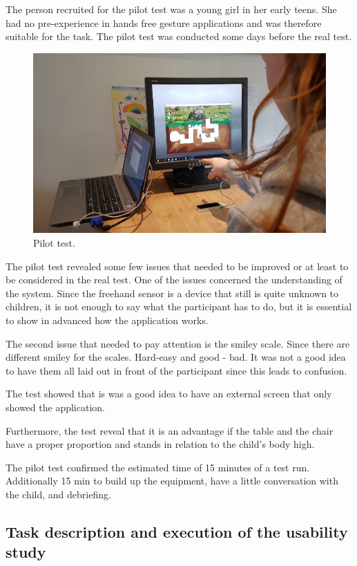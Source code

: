 The person recruited for the pilot test was a young girl in her early teens. She had no pre-experience in hands free gesture applications and was therefore suitable for the task.
The pilot test was conducted some days before the real test.

\begin{figure}[h]  %
  \centering
  \includegraphics[width=.5\textwidth]{figures/pilottest.jpg}
  \caption[Pilot test.]{Pilot test.}
  \label{fig:setup}
\end{figure}

The pilot test revealed some few issues that needed to be improved or at least to be considered in the real test.  One of the issues concerned the understanding of the system. Since the freehand sensor is a device that still is quite unknown to children,  it is  not enough to say what the participant has to do, but it is  essential to show in advanced how the application works.

The second issue that needed to pay attention is the smiley scale. Since there are different smiley for the scales. Hard-easy and good - bad. It was not a good idea to have them all laid out in front of the participant since this leads to confusion.

The test showed that is was a good idea to have an external screen that only showed the application. 

Furthermore, the test reveal that it is an advantage if the table and the chair have a proper proportion and stands  in relation to the child's body high.

 
The pilot test confirmed the estimated time of 15 minutes of a test run. Additionally 15 min to build up the equipment, have a little conversation with the child, and debriefing.

\subsection{Task description and execution of the usability study}

